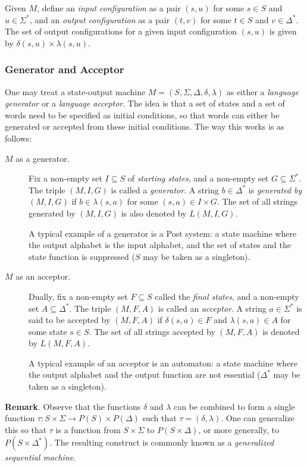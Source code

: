 \documentclass[12pt]{article}
\begin{document}
Given $M$, define an \emph{input configuration} as a pair $(s,u)$ for some $s\in S$ and $u\in \Sigma^*$, and an \emph{output configuration} as a pair $(t,v)$ for some $t\in S$ and $v\in \Delta^*$.  The set of output configurations for a given input configuration $(s,u)$ is given by $\delta(s,u)\times \lambda(s,u)$.

\subsubsection*{Generator and Acceptor}

One may treat a state-output machine $M=(S,\Sigma,\Delta, \delta,\lambda)$ as either a \emph{language generator} or a \emph{language acceptor}.  The idea is that a set of states and a set of words need to be specified as initial conditions, so that words can either be generated or accepted from these initial conditions.  The way this works is as follows:
\begin{description}
\item[$M$ as a generator.]  Fix a non-empty set $I\subseteq S$ of \emph{starting states}, and a non-empty set $G\subseteq \Sigma^*$.  The triple $(M,I,G)$ is called a \emph{generator}.  A string $b\in \Delta^*$ is \emph{generated by} $(M,I,G)$ if $b\in \lambda(s,a)$ for some $(s,a)\in I\times G$.  The set of all strings generated by $(M,I,G)$ is also denoted by $L(M,I,G)$.

A typical example of a generator is a Post system: a state machine where the output alphabet is the input alphabet, and the set of states and the state function is suppressed ($S$ may be taken as a singleton).

\item[$M$ as an acceptor.]  Dually, fix a non-empty set $F\subseteq S$ called the \emph{final states}, and a non-empty set $A\subseteq \Delta^*$.  The triple $(M,F,A)$ is called an \emph{acceptor}.  A string $a\in \Sigma^*$ is said to be accepted by $(M,F,A)$ if $\delta(s,a)\in F$ and $\lambda(s,a)\in A$ for some state $s\in S$.  The set of all strings accepted by $(M,F,A)$ is denoted by $L(M,F,A)$.  

A typical example of an acceptor is an automaton: a state machine where the output alphabet and the output function are not essential ($\Delta^*$ may be taken as a singleton).
\end{description}

\textbf{Remark}.  Observe that the functions $\delta$ and $\lambda$ can be combined to form a single function $\tau: S\times \Sigma \to P(S)\times P(\Delta)$ such that $\tau=(\delta,\lambda)$.  One can generalize this so that $\tau$ is a function from $S\times \Sigma$ to $P(S\times \Delta)$, or more generally, to $P(S\times \Delta^*)$.  The resulting construct is commonly known as a \emph{generalized sequential machine}.
\end{document}
